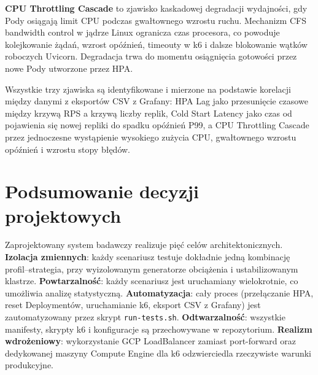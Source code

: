 \textbf{CPU Throttling Cascade} to zjawisko kaskadowej degradacji wydajności, gdy Pody osiągają limit CPU podczas gwałtownego wzrostu ruchu. Mechanizm CFS bandwidth control w jądrze Linux ogranicza czas procesora, co powoduje kolejkowanie żądań, wzrost opóźnień, timeouty w k6 i dalsze blokowanie wątków roboczych Uvicorn. Degradacja trwa do momentu osiągnięcia gotowości przez nowe Pody utworzone przez HPA.

Wszystkie trzy zjawiska są identyfikowane i mierzone na podstawie korelacji między danymi z eksportów CSV z Grafany: HPA Lag jako przesunięcie czasowe między krzywą RPS a krzywą liczby replik, Cold Start Latency jako czas od pojawienia się nowej repliki do spadku opóźnień P99, a CPU Throttling Cascade przez jednoczesne wystąpienie wysokiego zużycia CPU, gwałtownego wzrostu opóźnień i wzrostu stopy błędów.

\section{Podsumowanie decyzji projektowych}

Zaprojektowany system badawczy realizuje pięć celów architektonicznych. \textbf{Izolacja zmiennych}: każdy scenariusz testuje dokładnie jedną kombinację profil--strategia, przy wyizolowanym generatorze obciążenia i ustabilizowanym klastrze. \textbf{Powtarzalność}: każdy scenariusz jest uruchamiany wielokrotnie, co umożliwia analizę statystyczną. \textbf{Automatyzacja}: cały proces (przełączanie HPA, reset Deploymentów, uruchamianie k6, eksport CSV z Grafany) jest zautomatyzowany przez skrypt \texttt{run-tests.sh}. \textbf{Odtwarzalność}: wszystkie manifesty, skrypty k6 i konfiguracje są przechowywane w repozytorium. \textbf{Realizm wdrożeniowy}: wykorzystanie GCP LoadBalancer zamiast port-forward oraz dedykowanej maszyny Compute Engine dla k6 odzwierciedla rzeczywiste warunki produkcyjne.
